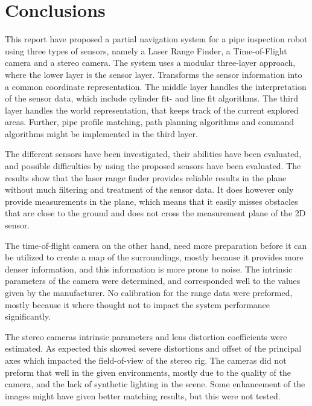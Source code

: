 
\chapter{Conclusions}
\label{chap9}
This report have proposed a partial navigation system for a pipe inspection robot using three
types of sensors, namely a Laser Range Finder, a Time-of-Flight camera and a stereo
camera. The system uses a modular three-layer approach, where the lower layer is the
sensor layer. Transforms the sensor information into a common coordinate
representation. The middle layer handles the interpretation of the sensor data, which include cylinder fit-
and line fit algorithms. The third layer handles the world representation, that keeps track of
the current explored areas. Further, pipe profile matching, path planning algorithms and command
algorithms might be implemented in the third layer.

The different sensors have been investigated, their abilities have been
evaluated, and possible difficulties by using the proposed sensors have been evaluated.
The results show that the laser range finder provides reliable results in the plane without much
filtering and treatment of the sensor data. It does however only provide measurements in the
plane, which means that it easily misses obstacles that are close to the ground and does
not cross the measurement plane of the 2D sensor. 

The time-of-flight camera on the other hand,
need more preparation before it can be utilized to create a map of the surroundings,
mostly because it provides more denser information, and this information is more prone to
noise. The intrinsic parameters of the camera were determined, and corresponded well to
the values given by the manufacturer. No calibration for the range data were preformed, 
mostly because it where thought not to impact the system performance significantly. 

The stereo cameras intrinsic parameters and lens distortion coefficients were estimated.
As expected this showed severe distortions and offset of the principal axes which impacted
the field-of-view of the stereo rig. The cameras did not preform that well in the given
environments, mostly due to the quality of the camera, and the lack of synthetic
lighting in the scene. Some enhancement of the images might have given better matching
results, but this were not tested.

